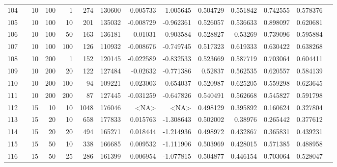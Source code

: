 \begin{longtable}{llrrrrrrrrrrrr}
		104 & &           10 &               100 &            1 &         274 &     130600 & -0.005733 & -1.005645 &  0.504729 &    0.551842 &       0.742555 &  0.578376 \\
		105 & &           10 &               100 &           10 &         201 &     135032 & -0.008729 & -0.962361 &  0.526057 &    0.536633 &       0.898097 &  0.620681 \\
		106 & &           10 &               100 &           50 &         163 &     136181 &  -0.01031 & -0.903584 &  0.528827 &     0.53269 &       0.739096 &  0.595884 \\
		107 & &           10 &               100 &          100 &         126 &     110932 & -0.008676 & -0.749745 &  0.517323 &    0.619333 &       0.630422 &  0.638268 \\
		108 & &           10 &               200 &            1 &         152 &     120145 & -0.022589 & -0.832533 &  0.523669 &    0.587719 &       0.703064 &  0.604411 \\
		109 & &           10 &               200 &           20 &         122 &     127484 &  -0.02632 & -0.771386 &   0.52837 &    0.562535 &       0.620557 &  0.584139 \\
		110 & &           10 &               200 &          100 &          94 &     109221 & -0.023003 & -0.654037 &  0.520987 &    0.625205 &       0.559298 &  0.623645 \\
		111 & &           10 &               200 &          200 &          87 &     127445 & -0.031259 & -0.647826 &  0.540491 &    0.562668 &       0.545827 &  0.591798 \\
		112 & &           15 &                10 &           10 &           1048 &     176046 &      <NA> &      <NA> &  0.498129 &    0.395892 &       0.160624 &  0.327804 \\
		113 & &           15 &                20 &           10 &         658 &     177833 &  0.015763 & -1.308643 &  0.502002 &     0.38976 &       0.265442 &  0.377612 \\
		114 & &           15 &                20 &           20 &         494 &     165271 &  0.018444 & -1.214936 &  0.498972 &    0.432867 &       0.365831 &  0.439231 \\
		115 & &           15 &                50 &           10 &         338 &     166685 &  0.009532 & -1.111906 &  0.503969 &    0.428015 &       0.571385 &  0.488958 \\
		116 & &           15 &                50 &           25 &         286 &     161399 &  0.006954 & -1.077815 &  0.504877 &    0.446154 &       0.703064 &  0.528047 \\

\end{longtable}
